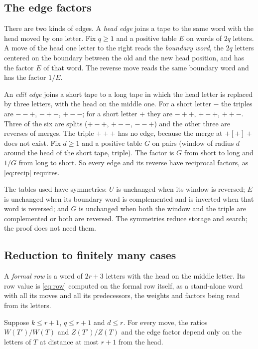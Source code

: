 \subsection{The edge factors}

There are two kinds of edges. A \emph{head edge} joins a tape to the same word with the head moved by one letter. Fix
$q\ge1$ and a positive table $E$ on words of $2q$ letters. A move of the head one letter to the right reads the
\emph{boundary word}, the $2q$ letters centered on the boundary between the old and the new head position, and has
the factor $E$ of that word. The reverse move reads the same boundary word and has the factor $1/E$.

An \emph{edit edge} joins a short tape to a long tape in which the head letter is replaced by three letters, with the
head on the middle one. For a short letter $-$ the triples are $--+$, $-+-$, $+--$; for a short letter $+$ they are
$-++$, $+-+$, $++-$. Three of the six are splits ($+-+$, $+--$, $--+$) and the other three are reverses of merges.
The triple $+++$ has no edge, because the merge at $+[+]+$ does not exist. Fix $d\ge1$ and a positive table $G$ on
pairs (window of radius $d$ around the head of the short tape, triple). The factor is $G$ from short to long and $1/G$
from long to short. So every edge and its reverse have reciprocal factors, as \eqref{eq:recip} requires.

The tables used have symmetries: $U$ is unchanged when its window is reversed; $E$ is unchanged when its boundary
word is complemented and is inverted when that word is reversed; and $G$ is unchanged when both the window and the
triple are complemented or both are reversed. The symmetries reduce storage and search; the proof does not need them.

\subsection{Reduction to finitely many cases}

A \emph{formal row} is a word of $2r+3$ letters with the head on the middle letter. Its row value is \eqref{eq:row}
computed on the formal row itself, as a stand-alone word with all its moves and all its predecessors, the weights and
factors being read from its letters.

\begin{lemma}[locality]\label{lem:local}
Suppose $k\le r+1$, $q\le r+1$ and $d\le r$. For every move, the ratios $W(T')/W(T)$ and $Z(T')/Z(T)$ and the edge
factor depend only on the letters of $T$ at distance at most $r+1$ from the head.
\end{lemma}

